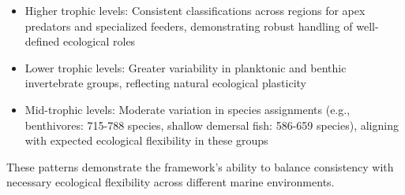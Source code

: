 \begin{itemize}
    \item Higher trophic levels: Consistent classifications across regions for apex predators and specialized feeders, demonstrating robust handling of well-defined ecological roles
    \item Lower trophic levels: Greater variability in planktonic and benthic invertebrate groups, reflecting natural ecological plasticity
    \item Mid-trophic levels: Moderate variation in species assignments (e.g., benthivores: 715-788 species, shallow demersal fish: 586-659 species), aligning with expected ecological flexibility in these groups
\end{itemize}

These patterns demonstrate the framework's ability to balance consistency with necessary ecological flexibility across different marine environments.

